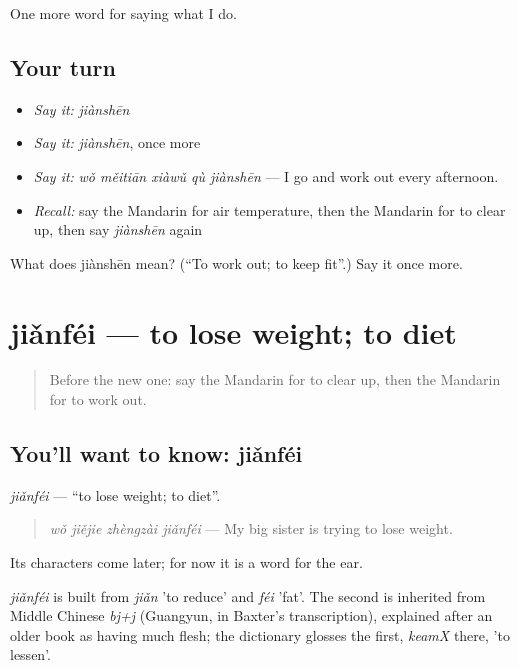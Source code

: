 \begin{grammarlens}[title={What you've built}]
One more word for saying what I do.
\end{grammarlens}

\subsection*{Your turn}
\begin{itemize}
\raggedright
  \item \emph{Say it:} \emph{jiànshēn}
  \item \emph{Say it:} \emph{jiànshēn}, once more
  \item \emph{Say it:} \emph{wǒ měitiān xiàwǔ qù jiànshēn} — I go and work out every afternoon.
  \item \emph{Recall:} say the Mandarin for air temperature, then the Mandarin for to clear up, then say \emph{jiànshēn} again
\end{itemize}

\begin{tcolorbox}[breakable,colback=teal!4,colframe=teal!35!black,title={Before you move on}]
What does jiànshēn mean? (\textquotedblleft{}To work out; to keep fit\textquotedblright{}.) Say it once more.
\end{tcolorbox}
\section[jiǎnféi]{jiǎnféi — to lose weight; to diet}

\label{lesson:ZH-C220-jianfei}



\begin{quote}
Before the new one: say the Mandarin for to clear up, then the Mandarin for to work out.
\end{quote}

\subsection*{You'll want to know: jiǎnféi}
\emph{jiǎnféi} — \textquotedblleft{}to lose weight; to diet\textquotedblright{}.

\begin{quote}
\emph{wǒ jiějie zhèngzài jiǎnféi} — My big sister is trying to lose weight.
\end{quote}

Its characters come later; for now it is a word for the ear.

\begin{cousinweb}
\emph{jiǎnféi} is built from \emph{jiǎn} 'to reduce' and \emph{féi} 'fat'. The second is inherited from Middle Chinese \emph{bj+j} (Guangyun, in Baxter's transcription), explained after an older book as having much flesh; the dictionary glosses the first, \emph{keamX} there, 'to lessen'.
\end{cousinweb}

